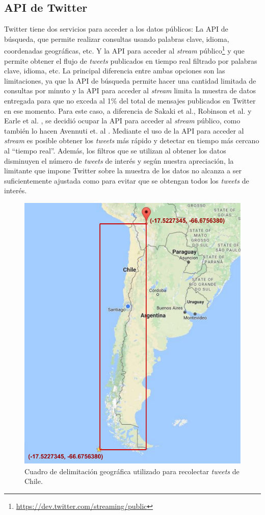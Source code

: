 \subsection{API de Twitter}

Twitter tiene dos servicios para acceder a los datos públicos: 
%
La API de búsqueda, que permite realizar consultas usando palabras clave, idioma, coordenadas geográficas, etc. 
%
Y la API para acceder al \textit{stream} público\footnote{\url{https://dev.twitter.com/streaming/public}} y que permite obtener el flujo de \textit{tweets} publicados en tiempo real filtrado por palabras clave, idioma, etc.
%
La principal diferencia entre ambas opciones son las limitaciones, ya que la API de búsqueda permite hacer una cantidad limitada de consultas por minuto y la API para acceder al \textit{stream} limita la muestra de datos entregada para que no exceda al 1\% del total de mensajes publicados en Twitter en ese momento.
% 
Para este caso, a diferencia de Sakaki et al.\cite{sakaki2013tweet}, Robinson et al. \cite{robinson2013sensitive} y Earle et al. \cite{earle2012twitter}, se decidió ocupar la API para acceder al \textit{stream} público, como también lo hacen Avennuti et. al \cite{avvenuti2014earthquake}.
%
Mediante el uso de la API para acceder al \textit{stream} es posible obtener los \textit{tweets} más rápido y detectar en tiempo más cercano al ``tiempo real''. Además, los filtros que se utilizan al obtener los datos disminuyen el número de \textit{tweets} de interés y según nuestra apreciación, la limitante que impone Twitter sobre la muestra de los datos no alcanza a ser suficientemente ajustada como para evitar que se obtengan todos los \textit{tweets} de interés. 

\begin{figure}[h]
	\centering
	\includegraphics[width=0.5\linewidth]{imagenes/boundingbox.pdf}
	\caption{Cuadro de delimitación geográfica utilizado para recolectar \textit{tweets} de Chile.}
	\label{img:boundingbox}
\end{figure}

